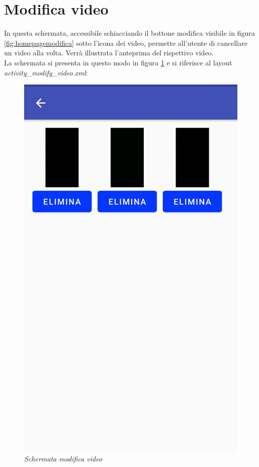\section{Modifica video}
\label{modificavideo}
In questa schermata, accessibile schiacciando il bottone modifica visibile in figura \ref{fig:homepagemodifica} sotto l'icona dei video, permette all'utente di cancellare un video alla volta. Verrà illustrata l'anteprima del rispettivo video.
\\La schermata si presenta in questo modo in figura \ref{fig:modificavideo} e si riferisce al layout \textit{activity\_modify\_video.xml}:
\begin{figure}[!h]
    \centering
	\includegraphics[scale=0.14]{Tesi/images/ModificaVideo.jpg}
	\caption{\textit{Schermata modifica video}}
	\label{fig:modificavideo}
\end{figure}
